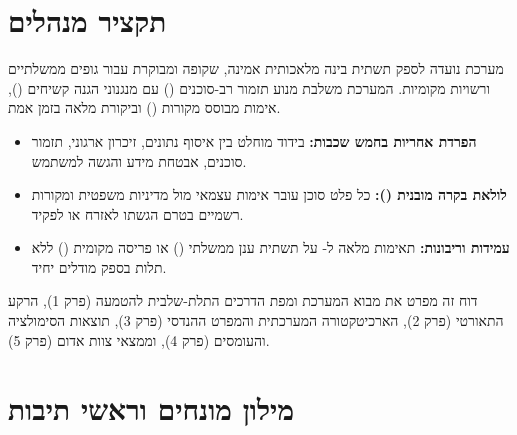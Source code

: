 \documentclass[11pt,a4paper,twoside,openany]{civicshield}
\begin{document}
\chapter*{תקציר מנהלים}

מערכת  נועדה לספק תשתית בינה מלאכותית אמינה, שקופה ומבוקרת עבור גופים ממשלתיים ורשויות מקומיות. המערכת משלבת מנוע תזמור רב-סוכנים () עם מנגנוני הגנה קשיחים (), אימות מבוסס מקורות () וביקורת מלאה בזמן אמת.

\begin{insightbox}
\begin{itemize}[leftmargin=1.5em]
  \item \textbf{הפרדת אחריות בחמש שכבות:} בידוד מוחלט בין איסוף נתונים, זיכרון ארגוני, תזמור סוכנים, אבטחת מידע והגשה למשתמש.
  \item \textbf{לולאת בקרה מובנית ():} כל פלט סוכן עובר אימות עצמאי מול מדיניות משפטית ומקורות רשמיים בטרם הגשתו לאזרח או לפקיד.
  \item \textbf{עמידות וריבונות:} תאימות מלאה ל- על תשתית ענן ממשלתי () או פריסה מקומית () ללא תלות בספק מודלים יחיד.
\end{itemize}
\end{insightbox}

דוח זה מפרט את מבוא המערכת ומפת הדרכים התלת-שלבית להטמעה (פרק 1), הרקע התאורטי (פרק 2), הארכיטקטורה המערכתית והמפרט ההנדסי (פרק 3), תוצאות הסימולציה והעומסים (פרק 4), וממצאי צוות אדום (פרק 5).

\clearpage
\tableofcontents
\clearpage
\listoffigures
\listoftables

\clearpage
\chapter*{מילון מונחים וראשי תיבות}
\end{document}
